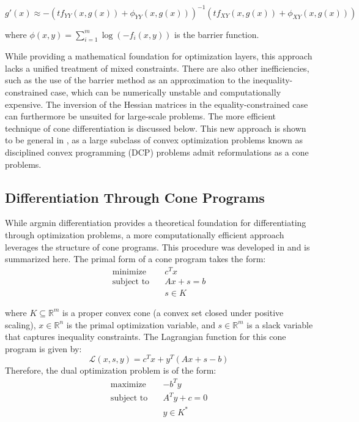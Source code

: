 \documentclass{article}
\begin{document}
\begin{equation}
g'(x) \approx -(tf_{YY}(x,g(x)) + \phi_{YY}(x,g(x)))^{-1}(tf_{XY}(x,g(x)) + \phi_{XY}(x,g(x)))
\end{equation}

where $\phi(x,y) = \sum_{i=1}^m \log(-f_i(x,y))$ is the barrier function.

While providing a mathematical foundation for optimization layers, this approach lacks a unified treatment of mixed constraints. There are also other inefficiencies, such as the use of the barrier method as an approximation to the inequality-constrained case, which can be numerically unstable and computationally expensive. The inversion of the Hessian matrices in the equality-constrained case can furthermore be unsuited for large-scale problems. The more efficient technique of cone differentiation is discussed below. This new approach is shown to be general in \citep{differentiableconvexoptimizationlayers}, as a large subclass of convex optimization problems known as disciplined convex programming (DCP) problems admit reformulations as a cone problems. 

\subsection{Differentiation Through Cone Programs}

While argmin differentiation provides a theoretical foundation for differentiating through optimization problems, a more computationally efficient approach leverages the structure of cone programs. This procedure was developed in \citep{conedifferentiation} and is summarized here. The primal form of a cone program takes the form:
\begin{equation}
\begin{aligned}
\text{minimize} \quad & c^T x \\
\text{subject to} \quad & Ax + s = b \\
                        & s \in K
\end{aligned}
\end{equation}

where $K \subseteq \mathbb{R}^m$ is a proper convex cone (a convex set closed under positive scaling), $x \in \mathbb{R}^n$ is the primal optimization variable, and $s \in \mathbb{R}^m$ is a slack variable that captures inequality constraints. The Lagrangian function for this cone program is given by:
\begin{equation}
\mathcal{L}(x,s,y) = c^T x + y^T(Ax + s - b)
\end{equation}
Therefore, the dual optimization problem is of the form:
\begin{equation}
\begin{aligned}
\text{maximize} \quad & -b^T y \\
\text{subject to} \quad & A^T y + c = 0 \\
                        & y \in K^*
\end{aligned}
\end{equation}
\end{document}
